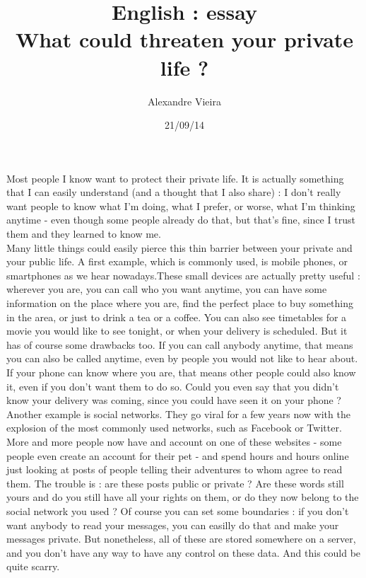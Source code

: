\documentclass{article}
\title{English : essay\\What could threaten your private life ?}
\author{Alexandre Vieira}
\date{21/09/14}
\begin{document}
\maketitle

Most people I know want to protect their private life. It is actually something that I can easily understand (and a thought that I also share) : I don't really want people to know what I'm doing, what I prefer, or worse, what I'm thinking anytime - even though some people already do that, but that's fine, since I trust them and they learned to know me.\\
Many little things could easily pierce this thin barrier between your private and your public life. A first example, which is commonly used, is mobile phones, or smartphones as we hear nowadays.These small devices are actually pretty useful : wherever you are, you can call who you want anytime, you can have some information on the place where you are, find the perfect place to buy something in the area, or just to drink a tea or a coffee. You can also see timetables for a movie you would like to see tonight, or when your delivery is scheduled.
But it has of course some drawbacks too. If you can call anybody anytime, that means you can also be called anytime, even by people you would not like to hear about. If your phone can know where you are, that means other people could also know it, even if you don't want them to do so. Could you even say that you didn't know your delivery was coming, since you could have seen it on your phone ? \\
Another example is social networks. They go viral for a few years now with the explosion of the most commonly used networks, such as Facebook or Twitter. More and more people now have and account on one of these websites - some people even create an account for their pet - and spend hours and hours online just looking at posts of people telling their adventures to whom agree to read them. The trouble is : are these posts public or private ? Are these words still yours and do you still have all your rights on them, or do they now belong to the social network you used ? Of course you can set some boundaries : if you don't want anybody to read your messages, you can easilly do that and make your messages private. But nonetheless, all of these are stored somewhere on a server, and you don't have any way to have any control on these data. And this could be quite scarry.
\end{document}
